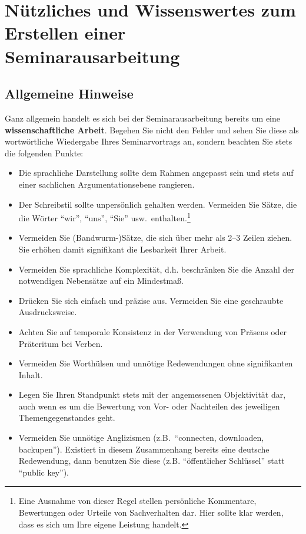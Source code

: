 %
\section{Nützliches und Wissenswertes zum Erstellen einer Seminarausarbeitung}
\label{sec_stil}

\subsection{Allgemeine Hinweise}
Ganz allgemein handelt es sich bei der Seminarausarbeitung bereits um eine {\bf wissenschaftliche Arbeit}.
Begehen Sie nicht den Fehler und sehen Sie diese als wortwörtliche Wiedergabe Ihres Seminarvortrags an, sondern beachten Sie stets die folgenden Punkte:
\begin{itemize}
\item Die sprachliche Darstellung sollte dem Rahmen angepasst sein und stets auf einer sachlichen Argumentationsebene rangieren.
\item Der Schreibstil sollte unpersönlich gehalten werden. 
Vermeiden Sie Sätze, die die Wörter "`wir"', "`uns"', "`Sie"' usw.~enthalten.\footnote{Eine Ausnahme von dieser Regel stellen persönliche Kommentare, Bewertungen oder Urteile von Sachverhalten dar. Hier sollte klar werden, dass es sich um Ihre eigene Leistung handelt.}
\item Vermeiden Sie (Bandwurm-)Sätze, die sich über mehr als 2--3 Zeilen ziehen. Sie erhöhen damit signifikant die Lesbarkeit Ihrer Arbeit.
\item Vermeiden Sie sprachliche Komplexität, d.h. beschränken Sie die Anzahl der notwendigen Nebensätze auf ein Mindestmaß.
\item Drücken Sie sich einfach und präzise aus. Vermeiden Sie eine \glqq geschraubte\grqq\, Ausdrucksweise.
\item Achten Sie auf temporale Konsistenz in der Verwendung von Präsens oder Präteritum  bei Verben.
\item Vermeiden Sie Worthülsen und unnötige Redewendungen ohne signifikanten Inhalt. 
\item Legen Sie Ihren Standpunkt stets mit der angemessenen Objektivität dar, auch wenn es um die Bewertung von Vor- oder Nachteilen des jeweiligen Themengegenstandes geht.
\item Vermeiden Sie unnötige Anglizismen (z.B.~"`connecten, downloaden, backupen"').
Existiert in diesem Zusammenhang bereits eine deutsche Redewendung, dann benutzen Sie diese (z.B. "`öffentlicher Schlüssel"' statt "`public key"').

\end{itemize}

